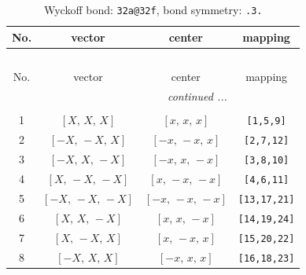 \documentclass[fleqn,8pt]{jsarticle}
\begin{document}
\begin{longtable}{cccc}
\caption{Wyckoff bond: {\tt 32a@32f}, bond symmetry: {\tt .3.}}
 \\
 \hline \hline
No. & vector & center & mapping \\ \hline \endfirsthead

\multicolumn{3}{l}{\tablename\ \thetable{}} \\
 \hline \hline
No. & vector & center & mapping \\ \hline \endhead

 \hline \hline
\multicolumn{3}{r}{\footnotesize\it continued ...} \\ \endfoot

 \hline \hline
\multicolumn{3}{r}{} \\ \endlastfoot

1 & $\left[ X,\, X,\, X \right]$ & $\left[ x,\, x,\, x \right]$ & {\tt [1,5,9]} \\ \hline
2 & $\left[ - X,\, - X,\, X \right]$ & $\left[ - x,\, - x,\, x \right]$ & {\tt [2,7,12]} \\ \hline
3 & $\left[ - X,\, X,\, - X \right]$ & $\left[ - x,\, x,\, - x \right]$ & {\tt [3,8,10]} \\ \hline
4 & $\left[ X,\, - X,\, - X \right]$ & $\left[ x,\, - x,\, - x \right]$ & {\tt [4,6,11]} \\ \hline
5 & $\left[ - X,\, - X,\, - X \right]$ & $\left[ - x,\, - x,\, - x \right]$ & {\tt [13,17,21]} \\ \hline
6 & $\left[ X,\, X,\, - X \right]$ & $\left[ x,\, x,\, - x \right]$ & {\tt [14,19,24]} \\ \hline
7 & $\left[ X,\, - X,\, X \right]$ & $\left[ x,\, - x,\, x \right]$ & {\tt [15,20,22]} \\ \hline
8 & $\left[ - X,\, X,\, X \right]$ & $\left[ - x,\, x,\, x \right]$ & {\tt [16,18,23]} \\
\end{longtable}
\renewcommand{\arraystretch}{1.2}
\end{document}
